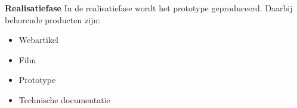 \textbf{Realisatiefase} 
In de realisatiefase wordt het prototype geproduceerd. Daarbij behorende producten zijn:
\begin{itemize}
	\item Webartikel
	\item Film
	\item Prototype
	\item Technische documentatie
\end{itemize}
\newpage

